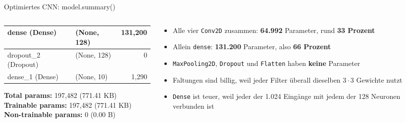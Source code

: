 \begin{frame}{Optimiertes CNN: model.summary()}
\begin{columns}
\begin{column}{0.47\linewidth}
{\begin{tabular}{|l|l|r|}
\hline
dense (\textcolor{jupytertype}{Dense}) & (\textcolor{jupytertype}{None}, \textcolor{jupyternum}{128}) & \textcolor{jupyternum}{131,200}\\
\hline
dropout\_2 (\textcolor{jupytertype}{Dropout}) & (\textcolor{jupytertype}{None}, \textcolor{jupyternum}{128}) & \textcolor{jupyternum}{0}\\
\hline
dense\_1 (\textcolor{jupytertype}{Dense}) & (\textcolor{jupytertype}{None}, \textcolor{jupyternum}{10}) & \textcolor{jupyternum}{1,290}\\
\hline
\end{tabular}

\vspace{0.5em}
\noindent\textbf{Total params:} \textcolor{jupyternum}{197,482} (771.41 KB)\\
\textbf{Trainable params:} \textcolor{jupyternum}{197,482} (771.41 KB)\\
\textbf{Non-trainable params:} \textcolor{jupyternum}{0} (0.00 B)
}
\end{column}
\begin{column}{0.48\linewidth}
    \footnotesize
\begin{itemize}
  \item Alle vier \texttt{Conv2D} zusammen: \textbf{64.992} Parameter, rund \textbf{33 Prozent}
  \item Allein \texttt{dense}: \textbf{131.200} Parameter, also \textbf{66 Prozent}
  \item \texttt{MaxPooling2D}, \texttt{Dropout} und \texttt{Flatten} haben \textbf{keine} Parameter
  \item Faltungen sind billig, weil jeder Filter überall dieselben $3 \cdot 3$ Gewichte nutzt
  \item \texttt{Dense} ist teuer, weil jeder der 1.024 Eingänge mit jedem der 128 Neuronen verbunden ist
\end{itemize}
\end{column}
\end{columns}
\end{frame}

